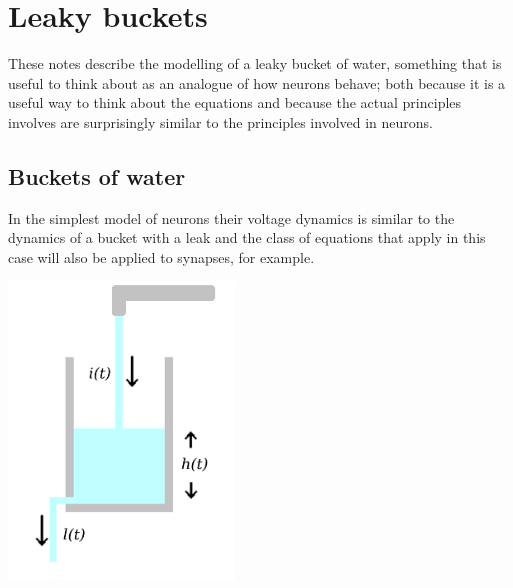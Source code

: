 \documentclass{article}
\begin{document}
\section*{Leaky buckets}
These notes describe the modelling of a leaky bucket of water,
something that is useful to think about as an analogue of how neurons
behave; both because it is a useful way to think about the equations
and because the actual principles involves are surprisingly similar to
the principles involved in neurons.

\subsection*{Buckets of water}

In the simplest model of neurons their voltage dynamics is similar to
the dynamics of a bucket with a leak and the class of equations that
apply in this case will also be applied to synapses, for example.

\begin{center}
  \includegraphics[width=6cm]{glass_notation.png}
\end{center}
\end{document}
